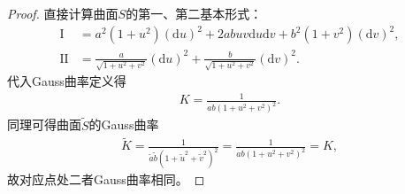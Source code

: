 \documentclass[../../main.tex]{subfiles}%
\begin{document}
\begin{proof}
直接计算曲面$S$的第一、第二基本形式：
\begin{align*}
\mathrm{I} &= a^2(1+u^2)(\mathrm{d}u)^2+2abuv\mathrm{d}u\mathrm{d}v+b^2(1+v^2)(\mathrm{d}v)^2,\\
\mathrm{II} &= \frac{a}{\sqrt{1+u^2+v^2}}(\mathrm{d}u)^2+\frac{b}{\sqrt{1+u^2+v^2}}(\mathrm{d}v)^2.
\end{align*}
代入Gauss曲率定义得
\begin{align}
K = \frac{1}{ab(1+u^2+v^2)^2}. \label{eq:ex_curv_S}
\end{align}
同理可得曲面$\tilde{S}$的Gauss曲率
\begin{align*}
\tilde{K} = \frac{1}{\tilde{a}\tilde{b}(1+\tilde{u}^2+\tilde{v}^2)^2} = \frac{1}{ab(1+u^2+v^2)^2}=K,
\end{align*}
故对应点处二者Gauss曲率相同。


\end{proof}
\end{document}
